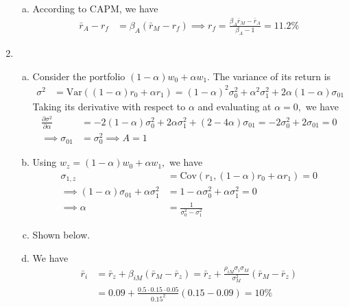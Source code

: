 \documentclass{article}
\newcommand{\var}{\mathrm{Var}}
\newcommand{\cov}{\mathrm{Cov}}
\begin{document}
\begin{enumerate}
\begin{enumerate}[(a)]
			\item 
				\begin{soln}
					According to CAPM, we have 
					\begin{align*}
						\bar r_A -r_f &= \beta_A(\bar r_M-r_f) \implies r_f = \frac{\beta_A\bar r_M - \bar r_A}{\beta_A-1} = 11.2\%
					\end{align*}
				\end{soln}
		\end{enumerate}

	\item 
		\begin{enumerate}[(a)]
			\item 
				\begin{soln}
					Consider the portfolio $(1-\alpha)w_0 + \alpha w_1.$ The variance of its return is
					\begin{align*}
						\sigma^2 &= \var( (1-\alpha)r_0 + \alpha r_1) = (1-\alpha)^2 \sigma_0^2 + \alpha^2 \sigma_1^2 + 2\alpha(1-\alpha)\sigma_{01}
					\end{align*}
					Taking its derivative with respect to $\alpha$ and evaluating at $\alpha=0,$ we have
					\begin{align*}
						\frac{\partial \sigma^2}{\partial \alpha} &= -2(1-\alpha)\sigma_0^2 + 2\alpha\sigma_1^2 + (2-4\alpha)\sigma_{01} = -2\sigma_0^2 + 2\sigma_{01} = 0 \\
						\implies \sigma_{01} &= \sigma_0^2 \implies A = 1
					\end{align*}
				\end{soln}

			\item 
				\begin{soln}
					Using $w_z=(1-\alpha)w_0+\alpha w_1,$ we have
					\begin{align*}
						\sigma_{1, z} &= \cov\left( r_1, (1-\alpha)r_0 + \alpha r_1 \right) = 0 \\
						\implies (1-\alpha) \sigma_{01} + \alpha\sigma_1^2 &= 1-\alpha\sigma_0^2 + \alpha\sigma_1^2 = 0 \\
						\implies \alpha &= \frac{1}{\sigma_0^2-\sigma_1^2}
					\end{align*}
				\end{soln}

			\item 
				\begin{soln}
					Shown below.
				\end{soln}

			\item 
				\begin{soln}
					We have
					\begin{align*}
						\bar r_i &= \bar r_z + \beta_{iM}(\bar r_M-\bar r_z) = \bar r_z+ \frac{\rho_{iM}\sigma_i\sigma_M}{\sigma_M^2}(\bar r_M-\bar r_z) \\
						&= 0.09 + \frac{0.5\cdot 0.15\cdot 0.05}{0.15^2}(0.15-0.09) = 10\%
					\end{align*}
				\end{soln}

		\end{enumerate}
		
\end{enumerate}
\end{document}
